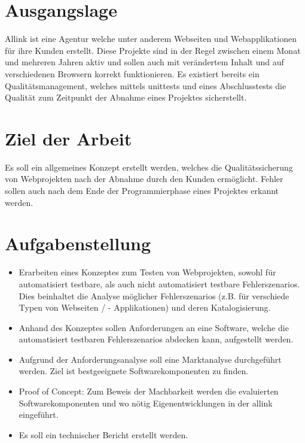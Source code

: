\section{Ausgangslage}
\label{sec:anhang_ausgangslage}
Allink ist eine Agentur welche unter anderem Webseiten und Webapplikationen für ihre Kunden erstellt. Diese Projekte sind in der Regel zwischen einem Monat und mehreren Jahren aktiv und sollen auch mit verändertem Inhalt und auf verschiedenen Browsern korrekt funktionieren. Es existiert bereits ein Qualitätsmanagement, welches mittels \glspl{unittest} und eines Abschlusstests die Qualität zum Zeitpunkt der Abnahme eines Projektes sicherstellt.

\section{Ziel der Arbeit}
\label{sec:anhang_ziel_der_arbeit}
Es soll ein allgemeines Konzept erstellt werden, welches die Qualitätssicherung von Webprojekten nach der Abnahme durch den Kunden ermöglicht. Fehler sollen auch nach dem Ende der Programmierphase eines Projektes erkannt werden.

\section{Aufgabenstellung}
\label{sec:anhang_aufgabenstellung}
\begin{itemize}
  \item Erarbeiten eines Konzeptes zum Testen von Webprojekten, sowohl für automatisiert testbare, als auch nicht automatisiert testbare Fehlerszenarios. Dies beinhaltet die Analyse möglicher Fehlerszenarios (z.B. für verschiede Typen von Webseiten / - Applikationen) und deren Katalogisierung.
  \item Anhand des Konzeptes sollen Anforderungen an eine Software, welche die automatisiert testbaren Fehlerszenarios abdecken kann, aufgestellt werden.
  \item Aufgrund der Anforderungsanalyse soll eine Marktanalyse durchgeführt werden. Ziel ist bestgeeignete Softwarekomponenten zu finden.
  \item Proof of Concept: Zum Beweis der Machbarkeit werden die evaluierten Softwarekomponenten und wo nötig Eigenentwicklungen in der allink eingeführt.
  \item Es soll ein technischer Bericht erstellt werden.
\end{itemize}

